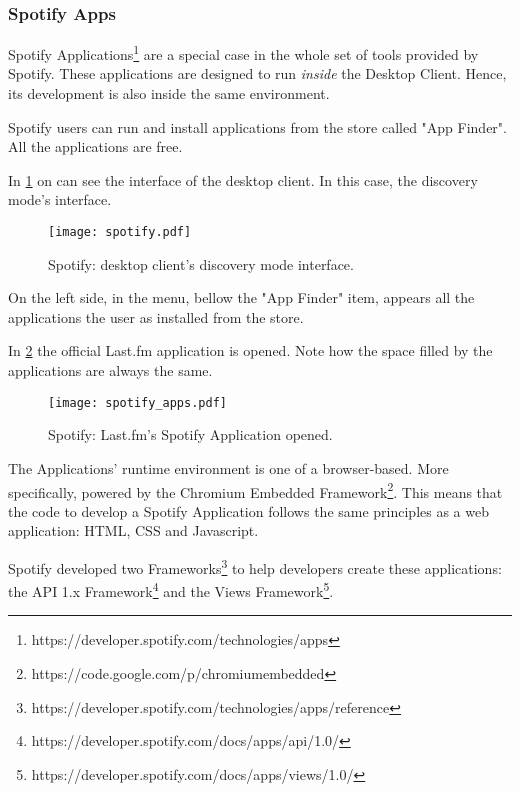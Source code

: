     \subsubsection{Spotify Apps} %
    \label{ssub:spotify_apps}
      Spotify Applications\footnote{https://developer.spotify.com/technologies/apps} are a special case in the whole set of tools provided by Spotify.
      These applications are designed to run \emph{inside} the Desktop Client.
      Hence, its development is also inside the same environment.

      Spotify users can run and install applications from the store called "App Finder".
      All the applications are free.

      In \ref{fig:spotify_apps} on can see the interface of the desktop client.
      In this case, the discovery mode's interface.

      \begin{figure}
        \begin{center}
          \texttt{[image: spotify.pdf]}
        \end{center}
        \caption{Spotify: desktop client's discovery mode interface.}
        \label{fig:spotify_apps}
      \end{figure}

      On the left side, in the menu, bellow the "App Finder" item, appears all the applications the user as installed from the store.

      In \ref{fig:spotify_apps2} the official Last.fm application is opened.
      Note how the space filled by the applications are always the same.

      \begin{figure}
        \begin{center}
          \texttt{[image: spotify\_apps.pdf]}
        \end{center}
        \caption{Spotify: Last.fm's Spotify Application opened.}
        \label{fig:spotify_apps2}
      \end{figure}

      The Applications' runtime environment is one of a browser-based.
      More specifically, powered by the Chromium Embedded Framework\footnote{https://code.google.com/p/chromiumembedded}.
      This means that the code to develop a Spotify Application follows the same principles as a web application: HTML, CSS and Javascript.

      Spotify developed two Frameworks\footnote{https://developer.spotify.com/technologies/apps/reference} to help developers create these applications: the API 1.x Framework\footnote{https://developer.spotify.com/docs/apps/api/1.0/} and the Views Framework\footnote{https://developer.spotify.com/docs/apps/views/1.0/}.


